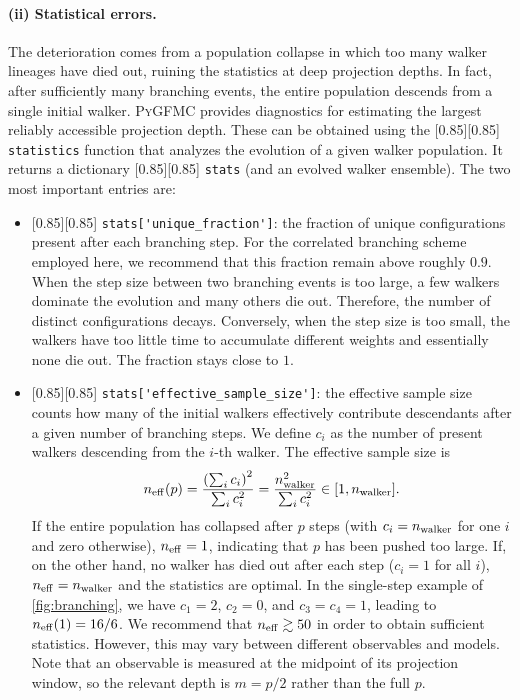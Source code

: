 \documentclass{SciPost}
\newcommand{\pyinline}[1]{\begingroup\setlength{\fboxsep}{0pt}%
  \colorbox{gray!15}{\raisebox{0pt}[0.85\ht\strutbox][0.85\dp\strutbox]{%
    \hspace{1pt}\lstinline{#1}\hspace{1pt}}}\endgroup}
\newcommand{\nwalker}{n_{\rm walker}}
\newcommand{\neff}{n_{\rm eff}}
\providecommand{\PyGFMC}{\textsc{PyGFMC}}
\begin{document}
\paragraph{(ii) Statistical errors.}
The deterioration comes from a population collapse in which too many walker lineages have died out, ruining the statistics at deep projection depths.
%
In fact, after sufficiently many branching events, the entire population descends from a single initial walker.
%
\PyGFMC{} provides diagnostics for estimating the largest reliably accessible projection depth.
%
These can be obtained using the \pyinline{statistics} function that analyzes the evolution of a given walker population.
%
It returns a dictionary \pyinline{stats} (and an evolved walker ensemble).
%
The two most important entries are:
\begin{itemize}
	\item \pyinline{stats['unique_fraction']}: the fraction of unique configurations present after each branching step.
		For the correlated branching scheme employed here, we recommend that this fraction remain above roughly $0.9$.
		When the step size between two branching events is too large, a few walkers dominate the evolution and many others die out.
		Therefore, the number of distinct configurations decays.
		Conversely, when the step size is too small, the walkers have too little time to accumulate different weights and essentially none die out.
		The fraction stays close to $1$.
	\item \pyinline{stats['effective_sample_size']}: the effective sample size counts how many of the initial walkers effectively contribute descendants after a given number of branching steps.
		We define $c_i$ as the number of present walkers descending from the $i$-th walker.
		The effective sample size is
		\begin{align}
			n_{\rm eff}(p) = \frac{\left(\sum_i c_i\right)^2}{\sum_i c_i^2}= \frac{\nwalker^2}{\sum_i c_i^2}\in [1,\nwalker].\label{eq:neff}
		\end{align}
		If the entire population has collapsed after $p$ steps (with $c_i=\nwalker$ for one $i$ and zero otherwise), $n_{\rm eff}=1$, indicating that $p$ has been pushed too large.
		If, on the other hand, no walker has died out after each step ($c_i=1$ for all $i$), $n_{\rm eff}=\nwalker$ and the statistics are optimal.
		In the single-step example of \autoref{fig:branching}, we have $c_1=2$, $c_2=0$, and $c_3=c_4=1$, leading to $\neff(1)=16/6$.
		We recommend that $n_{\rm eff} \gtrsim 50$ in order to obtain sufficient statistics.
		However, this may vary between different observables and models.
		Note that an observable is measured at the midpoint of its projection window, so the relevant depth is $m=p/2$ rather than the full $p$.


\end{itemize}
\end{document}
